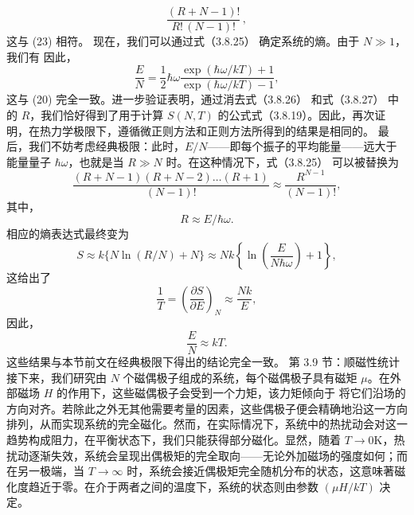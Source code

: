 \begin{equation}\tag{3.5.76}\label{eq:3.5.76}
\frac { ( R + N - 1 ) ! } { R ! \, ( N - 1 ) ! } \, ,
\end{equation}
这与 (23) 相符。
现在，我们可以通过式（3.8.25） 确定系统的熵。由于 \(N \gg 1\)，我们有
因此，
\begin{equation}\tag{3.5.77}\label{eq:3.5.77}
\frac { E } { N } = \frac { 1 } { 2 } \hbar \omega \frac { \exp ( \hbar \omega / k T ) + 1 } { \exp ( \hbar \omega / k T ) - 1 } ,
\end{equation}
这与 (20) 完全一致。进一步验证表明，通过消去式（3.8.26） 和式（3.8.27） 中的 \(R\)，我们恰好得到了用于计算 \(S(N,T)\) 的公式式（3.8.19）。因此，再次证明，在热力学极限下，遵循微正则方法和正则方法所得到的结果是相同的。
最后，我们不妨考虑经典极限：此时，\(E/N\)——即每个振子的平均能量——远大于能量量子 \(\hbar\omega\)，也就是当 \(R \gg N\) 时。在这种情况下，式（3.8.25） 可以被替换为
\begin{equation}\tag{3.5.78}\label{eq:3.5.78}
\frac { ( R + N - 1 ) ( R + N - 2 ) \ldots ( R + 1 ) } { ( N - 1 ) ! } \approx \frac { R ^{N - 1} } { ( N - 1 ) ! } ,
\end{equation}
其中，
\begin{equation}\tag{3.5.79}\label{eq:3.5.79}
R \approx E / \hbar \omega .
\end{equation}
相应的熵表达式最终变为
\begin{equation}\tag{3.5.80}\label{eq:3.5.80}
S \approx k \{ N \ln ( R / N ) + N \} \approx N k \left\{ \ln \left( \frac { E } { N \hbar \omega } \right) + 1 \right\} ,
\end{equation}
这给出了
\begin{equation}\tag{3.5.81}\label{eq:3.5.81}
\frac { 1 } { T } = \left( \frac { \partial S } { \partial E } \right) _ { N } \approx \frac { N k } { E } ,
\end{equation}
因此，
\begin{equation}\tag{3.5.82}\label{eq:3.5.82}
\frac { E } { N } \approx k T .
\end{equation}
这些结果与本节前文在经典极限下得出的结论完全一致。
第 3.9 节：顺磁性统计
接下来，我们研究由 \(N\) 个磁偶极子组成的系统，每个磁偶极子具有磁矩 \(\mu\)。在外部磁场 \(H\) 的作用下，这些磁偶极子会受到一个力矩，该力矩倾向于
将它们沿场的方向对齐。若除此之外无其他需要考量的因素，这些偶极子便会精确地沿这一方向排列，从而实现系统的完全磁化。然而，在实际情况下，系统中的热扰动会对这一趋势构成阻力，在平衡状态下，我们只能获得部分磁化。显然，随着 \(T \to 0\)K，热扰动逐渐失效，系统会呈现出偶极矩的完全取向——无论外加磁场的强度如何；而在另一极端，当 \(T \to \infty\) 时，系统会接近偶极矩完全随机分布的状态，这意味著磁化度趋近于零。在介于两者之间的温度下，系统的状态则由参数 \((\mu H/kT)\) 决定。
